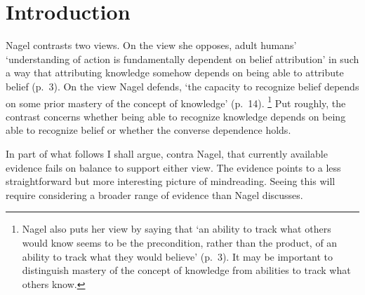 \documentclass[11pt,a4paper]{extarticle}
\begin{document}
\setlength\footnotesep{1em}




\maketitle





\section{Introduction}
Nagel contrasts two views.
On the view she opposes, 
adult humans' `understanding of action is fundamentally dependent on belief attribution' 
in such a way that
attributing knowledge  somehow depends on 
being able to attribute belief (p.\ 3).
On the view Nagel defends, `the capacity to recognize belief depends on some prior mastery of the concept of knowledge' (p.\ 14).%
\footnote{
Nagel also puts her view by saying that `an ability to track what others would know seems to be the precondition, rather than the product, of an ability to track what they would believe' (p.\ 3).
It may be important to distinguish mastery of the concept of knowledge from abilities to track what others know.
}
Put roughly, the contrast concerns whether being able to recognize knowledge depends on being able to recognize belief or whether the converse dependence holds.

In part of what follows
I shall
argue, contra  Nagel, that
currently available evidence fails on balance to support either view.
The evidence points to a less straightforward but more interesting picture of  mindreading.
Seeing this will require considering a broader range of evidence than Nagel discusses.
\end{document}
